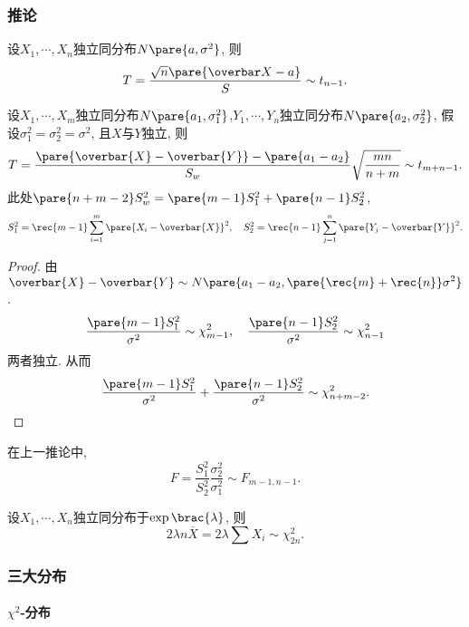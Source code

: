 \documentclass[../Statistics.tex]{subfiles}
\begin{document}
\subsubsection{推论} %
\label{ssub:推论}

\begin{corollary}
    设$X_1,\cdots,X_n$独立同分布$N\pare{a,\sigma^2}$, 则
    \[ T = \frac{\sqrt{n}\pare{\overbar X-a}}{S}\sim t_{n-1}. \]
\end{corollary}
\begin{corollary}
    设$X_1,\cdots,X_m$独立同分布$N\pare{a_1,\sigma_1^2}$,$Y_1,\cdots,Y_n$独立同分布$N\pare{a_2,\sigma_2^2}$, 假设$\sigma_1^2 = \sigma_2^2 = \sigma^2$, 且$X$与$Y$独立, 则
    \[ T = \frac{\pare{\overbar{X} - \overbar{Y}} - \pare{a_1 - a_2}}{S_w}\sqrt{\frac{mn}{n+m}}\sim t_{m+n-1}. \]
    此处$\pare{n+m-2}S_w^2 = \pare{m-1}S_1^2 + \pare{n-1}S_2^2$,
    \[ S_1^2 = \rec{m-1}\sum_{i=1}^m \pare{X_i - \overbar{X}}^2,\quad S_2^2 = \rec{n-1}\sum_{j=1}^n \pare{Y_j - \overbar{Y}}^2. \]
\end{corollary}
\begin{proof}
    由$\overbar{X} - \overbar{Y} \sim N\pare{a_1 - a_2, \displaystyle \pare{\rec{m} + \rec{n}}\sigma^2}$.
    \[ \frac{\pare{m-1}S_1^2}{\sigma^2} \sim \chi_{m-1}^2,\quad \frac{\pare{n-1}S_2^2}{\sigma^2}\sim \chi_{n-1}^2 \]
    两者独立. 从而
    \[ \frac{\pare{m-1}S_1^2}{\sigma^2} + \frac{\pare{n-1}S_2^2}{\sigma^2} \sim \chi_{n+m-2}^2. \qedhere \]
\end{proof}
\begin{corollary}
    在上一推论中,
    \[ F = \frac{S_1^2}{S_2^2} \frac{\sigma_2^2}{\sigma_1^2} \sim F_{m-1,n-1}. \]
\end{corollary}
\begin{corollary}
    设$X_1,\cdots,X_n$独立同分布于$\exp\brac{\lambda}$, 则
    \[ 2\lambda n\overbar{X} = 2\lambda \sum X_i \sim \chi_{2n}^2. \]
\end{corollary}


\subsubsection{三大分布} %
\label{ssub:三大分布}

\paragraph{$\chi^2$-分布} %
\label{par:chi_2分布}
\end{document}
